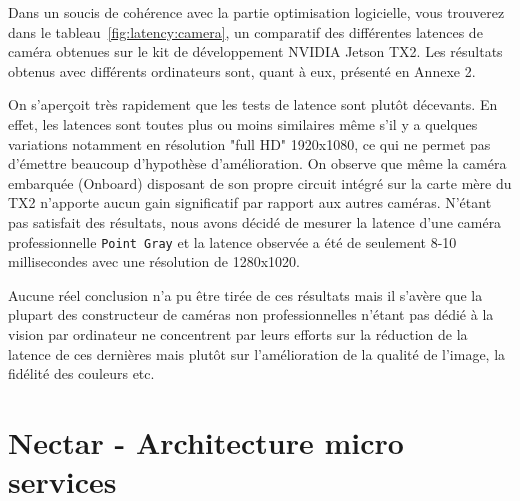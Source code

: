 Dans un soucis de cohérence avec la partie optimisation logicielle, vous trouverez dans le tableau~\ref{fig:latency:camera}, un comparatif des différentes latences de caméra obtenues sur le kit de développement NVIDIA Jetson TX2. Les résultats obtenus avec différents ordinateurs sont, quant à eux, présenté en Annexe 2.

\begin{table}[H]
\centering
\caption{Latence (en ms) de plusieurs caméras mesurée en Glass to glass - NVIDIA Jetson TX2}
\label{fig:latency:camera}
\end{table}

On s'aperçoit très rapidement que les tests de latence sont plutôt décevants. En effet, les latences sont toutes plus ou moins similaires même s'il y a quelques variations notamment en résolution "full HD" 1920x1080, ce qui ne permet pas d'émettre beaucoup d'hypothèse d'amélioration. On observe que même la caméra embarquée (Onboard) disposant de son propre circuit intégré sur la carte mère du TX2 n'apporte aucun gain significatif par rapport aux autres caméras.
N'étant pas satisfait des résultats, nous avons décidé de mesurer la latence d'une caméra professionnelle \texttt{Point Gray} et la latence observée a été de seulement 8-10 millisecondes avec une résolution de 1280x1020. 

Aucune réel conclusion n'a pu être tirée de ces résultats mais il s'avère que la plupart des constructeur de caméras non professionnelles n'étant pas dédié à la vision par ordinateur ne concentrent par leurs efforts sur la réduction de la latence de ces dernières mais plutôt sur l'amélioration de la qualité de l'image, la fidélité des couleurs etc.

\newpage
\section{Nectar - Architecture micro services}
\label{sec:nectararchi}

